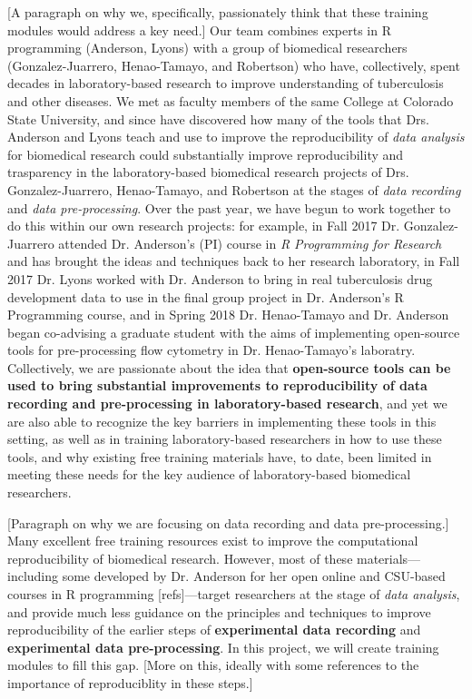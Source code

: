 \documentclass[pdftex,english,11pt,parskip=half]{scrartcl}
\begin{document}
[A paragraph on why we, specifically, passionately think that these training
modules would address a key need.] Our team combines experts in R programming
(Anderson, Lyons) with a group of biomedical researchers (Gonzalez-Juarrero,
Henao-Tamayo, and Robertson) who have, collectively, spent decades in
laboratory-based research to improve understanding of tuberculosis and other
diseases. We met as faculty members of the same College at Colorado State
University, and since have discovered how many of the tools that Drs. Anderson
and Lyons teach and use to improve the reproducibility of \textit{data analysis}
for biomedical research could substantially improve reproducibility and
trasparency in the laboratory-based biomedical research projects of Drs.
Gonzalez-Juarrero, Henao-Tamayo, and Robertson at the stages of \textit{data
recording} and \textit{data pre-processing}. Over the past year, we have begun
to work together to do this within our own research projects: for example, in
Fall 2017 Dr. Gonzalez-Juarrero attended Dr. Anderson's (PI) course in \textit{R
Programming for Research} and has brought the ideas and techniques back to her
research laboratory, in Fall 2017 Dr. Lyons worked with Dr. Anderson to bring in
real tuberculosis drug development data to use in the final group project in Dr.
Anderson's R Programming course, and in Spring 2018 Dr. Henao-Tamayo and Dr.
Anderson began co-advising a graduate student with the aims of implementing
open-source tools for pre-processing flow cytometry in Dr. Henao-Tamayo's
laboratry. Collectively, we are passionate about the idea that
\textbf{open-source tools can be used to bring substantial improvements to
reproducibility of data recording and pre-processing in laboratory-based
research}, and yet we are also able to recognize the key barriers in
implementing these tools in this setting, as well as in training
laboratory-based researchers in how to use these tools, and why existing free
training materials have, to date, been limited in meeting these needs for the
key audience of laboratory-based biomedical researchers. 

[Paragraph on why we are focusing on data recording and data pre-processing.]
Many excellent free training resources exist to improve the computational
reproducibility of biomedical research. However, most of these
materials---including some developed by Dr. Anderson for her open online and
CSU-based courses in R programming [refs]---target researchers at the stage of
\textit{data analysis}, and provide much less guidance on the principles and
techniques to improve reproducibility of the earlier steps of
\textbf{experimental data recording} and \textbf{experimental data
pre-processing}. In this project, we will create training modules to fill this
gap. [More on this, ideally with some references to the importance of
reproduciblity in these steps.]
\end{document}
